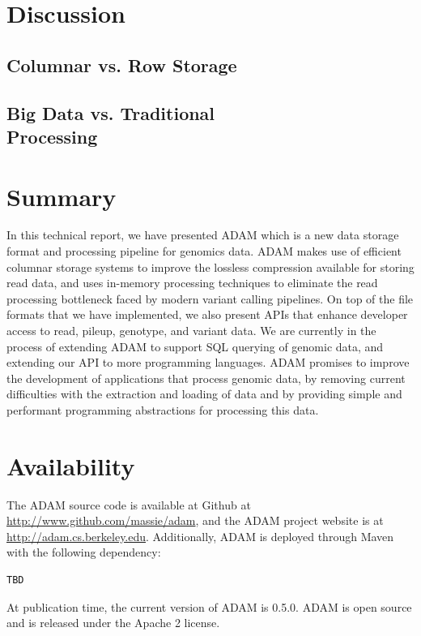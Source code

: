 \documentclass[10pt,twocolumn]{article}
\begin{document}
\section{Discussion}
\label{sec:discussion}

\subsection{Columnar vs. Row Storage}
\label{sec:columnar-vs-row-storage}

\subsection{Big Data vs. Traditional\\Processing}
\label{sec:big-data}

\section{Summary}
\label{sec:summary}

In this technical report, we have presented ADAM which is a new data storage format and processing pipeline for
genomics data. ADAM makes use of efficient columnar storage systems to improve the lossless compression available
for storing read data, and uses in-memory processing techniques to eliminate the read processing bottleneck faced
by modern variant calling pipelines. On top of the file formats that we have implemented, we also present APIs that enhance
developer access to read, pileup, genotype, and variant data. We are currently in the process of extending ADAM to
support SQL querying of genomic data, and extending our API to more programming languages. ADAM promises
to improve the development of applications that process genomic data, by removing current difficulties with the extraction
and loading of data and by providing simple and performant programming abstractions for processing this data.

\section{Availability}
\label{sec:availability}

The ADAM source code is available at Github at \url{http://www.github.com/massie/adam}, and the ADAM project website
is at \url{http://adam.cs.berkeley.edu}. Additionally, ADAM is deployed through Maven with the following dependency:

\begin{verbatim}
TBD
\end{verbatim}

At publication time, the current version of ADAM is 0.5.0. ADAM is open source and is released under the Apache 2
license.





\clearpage
\end{document}
